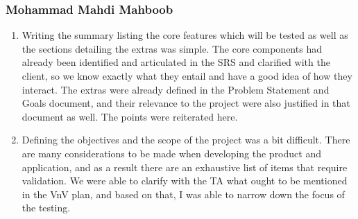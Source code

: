 \documentclass[12pt, titlepage]{article}
\begin{document}
\subsubsection*{Mohammad Mahdi Mahboob}
\begin{enumerate}[align=left,
  leftmargin=*,
  labelsep=1em,
  itemindent=0em, font=\bfseries]
  \item Writing the summary listing the core features which will be tested as well as the sections detailing the extras
    was simple. The core components had already been identified and articulated in the SRS and clarified with the
    client, so we know exactly what they entail and have a good idea of how they interact. The extras were already
    defined in the Problem Statement and Goals document, and their relevance to the project were also justified in that
    document as well. The points were reiterated here.
  \item Defining the objectives and the scope of the project was a bit difficult. There are many considerations to be
    made when developing the product and application, and as a result there are an exhaustive list of items that require
    validation. We were able to clarify with the TA what ought to be mentioned in the VnV plan, and based on that, I was
    able to narrow down the focus of the testing.
\end{enumerate}
\end{document}
